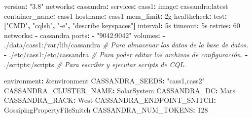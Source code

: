 \documentclass[
]{book}
\newenvironment{Shaded}{}{}
\newcommand{\AttributeTok}[1]{\textcolor[rgb]{0.49,0.56,0.16}{#1}}
\newcommand{\CommentTok}[1]{\textcolor[rgb]{0.38,0.63,0.69}{\textit{#1}}}
\newcommand{\DecValTok}[1]{\textcolor[rgb]{0.25,0.63,0.44}{#1}}
\newcommand{\FunctionTok}[1]{\textcolor[rgb]{0.02,0.16,0.49}{#1}}
\newcommand{\KeywordTok}[1]{\textcolor[rgb]{0.00,0.44,0.13}{\textbf{#1}}}
\newcommand{\OtherTok}[1]{\textcolor[rgb]{0.00,0.44,0.13}{#1}}
\newcommand{\StringTok}[1]{\textcolor[rgb]{0.25,0.44,0.63}{#1}}
\begin{document}
\begin{Shaded}
\begin{Highlighting}[]
\FunctionTok{version}\KeywordTok{:}\AttributeTok{ }\StringTok{"3.8"}
\FunctionTok{networks}\KeywordTok{:}
\AttributeTok{  }\FunctionTok{cassandra}\KeywordTok{:}
\FunctionTok{services}\KeywordTok{:}
\AttributeTok{  }\FunctionTok{cass1}\KeywordTok{:}
\AttributeTok{    }\FunctionTok{image}\KeywordTok{:}\AttributeTok{ cassandra:latest}
\AttributeTok{    }\FunctionTok{container\_name}\KeywordTok{:}\AttributeTok{ cass1}
\AttributeTok{    }\FunctionTok{hostname}\KeywordTok{:}\AttributeTok{ cass1}
\AttributeTok{    }\FunctionTok{mem\_limit}\KeywordTok{:}\AttributeTok{ 2g}
\AttributeTok{    }\FunctionTok{healthcheck}\KeywordTok{:}
\AttributeTok{      }\FunctionTok{test}\KeywordTok{:}\AttributeTok{ }\KeywordTok{[}\StringTok{"CMD"}\KeywordTok{,}\AttributeTok{ }\StringTok{"cqlsh"}\KeywordTok{,}\AttributeTok{ }\StringTok{"{-}e"}\KeywordTok{,}\AttributeTok{ }\StringTok{"describe keyspaces"}\KeywordTok{]}
\AttributeTok{      }\FunctionTok{interval}\KeywordTok{:}\AttributeTok{ 5s}
\AttributeTok{      }\FunctionTok{timeout}\KeywordTok{:}\AttributeTok{ 5s}
\AttributeTok{      }\FunctionTok{retries}\KeywordTok{:}\AttributeTok{ }\DecValTok{60}
\AttributeTok{    }\FunctionTok{networks}\KeywordTok{:}
\AttributeTok{      }\KeywordTok{{-}}\AttributeTok{ cassandra}
\AttributeTok{    }\FunctionTok{ports}\KeywordTok{:}
\AttributeTok{      }\KeywordTok{{-}}\AttributeTok{ }\StringTok{"9042:9042"}
\AttributeTok{    }\FunctionTok{volumes}\KeywordTok{:}
\AttributeTok{      }\KeywordTok{{-}}\AttributeTok{ ./data/cass1:/var/lib/cassandra}\CommentTok{ \# Para almacenar los datos de la base de datos.}
\AttributeTok{      }\KeywordTok{{-}}\AttributeTok{ ./etc/cass1:/etc/cassandra}\CommentTok{ \# Para poder editar los archivos de configuración.}
\AttributeTok{      }\KeywordTok{{-}}\AttributeTok{ ./scripts:/scripts}\CommentTok{ \# Para escribir y ejecutar scripts de CQL.}

\AttributeTok{    }\FunctionTok{environment}\KeywordTok{:}\AttributeTok{ }\OtherTok{\&environment}
\AttributeTok{      }\FunctionTok{CASSANDRA\_SEEDS}\KeywordTok{:}\AttributeTok{ }\StringTok{"cass1,cass2"}
\AttributeTok{      }\FunctionTok{CASSANDRA\_CLUSTER\_NAME}\KeywordTok{:}\AttributeTok{ SolarSystem}
\AttributeTok{      }\FunctionTok{CASSANDRA\_DC}\KeywordTok{:}\AttributeTok{ Mars}
\AttributeTok{      }\FunctionTok{CASSANDRA\_RACK}\KeywordTok{:}\AttributeTok{ West}
\AttributeTok{      }\FunctionTok{CASSANDRA\_ENDPOINT\_SNITCH}\KeywordTok{:}\AttributeTok{ GossipingPropertyFileSnitch}
\AttributeTok{      }\FunctionTok{CASSANDRA\_NUM\_TOKENS}\KeywordTok{:}\AttributeTok{ }\DecValTok{128}


\end{Highlighting}
\end{Shaded}
\end{document}
